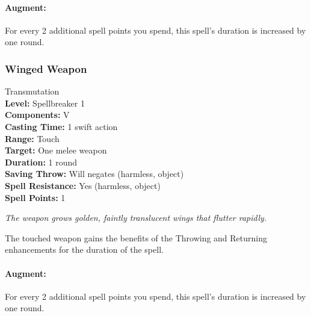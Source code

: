 \paragraph{Augment:} For every 2 additional spell points you spend, this spell's duration is increased by one round.

\subsubsection{Winged Weapon}
\label{Spell:WingedWeapon}
Transmutation
\\ \textbf{Level:} Spellbreaker 1
\\ \textbf{Components:} V
\\ \textbf{Casting Time:} 1 swift action
\\ \textbf{Range:} Touch
\\ \textbf{Target:} One melee weapon
\\ \textbf{Duration:} 1 round
\\ \textbf{Saving Throw:} Will negates (harmless, object)
\\ \textbf{Spell Resistance:} Yes (harmless, object)
\\ \textbf{Spell Points:} 1

\emph{The weapon grows golden, faintly translucent wings that flutter rapidly.}

The touched weapon gains the benefits of the Throwing and Returning enhancements for the duration of the spell.

\paragraph{Augment:} For every 2 additional spell points you spend, this spell's duration is increased by one round.


